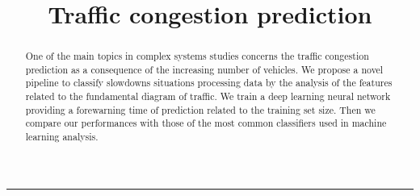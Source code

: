 \documentclass[a4paper,12pt]{article}
\title{\LARGE{\bf Traffic congestion prediction}}
\begin{document}
\maketitle
\thispagestyle{fancy}
\rule[0.2cm]{13.5cm}{0.2mm}

\begin{abstract}
One of the main topics in complex systems studies concerns the traffic congestion prediction as a consequence of the increasing number of vehicles. We propose a novel pipeline to classify slowdowns situations processing data by the analysis of the features related to the fundamental diagram of traffic. We train a deep learning neural network providing a forewarning time of prediction related to the training set size. Then we compare our performances with those of the most common classifiers used in machine learning analysis. 



\end{abstract}
\end{document}
